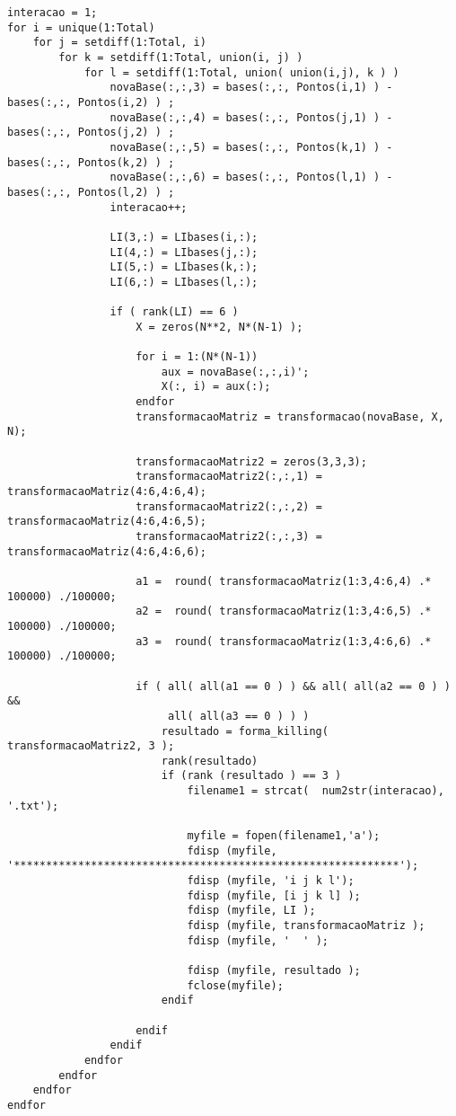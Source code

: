 \documentclass[twoside,openright,titlepage,numbers=noenddot,headinclude,  lineheaders footinclude=true,cleardoublepage=empty,
                                BCOR=5mm,paper=a4,fontsize=12pt ]{scrbook}
\theoremstyle{definition}
\begin{document}
\begin{lstlisting}
interacao = 1;
for i = unique(1:Total)
	for j = setdiff(1:Total, i)
		for k = setdiff(1:Total, union(i, j) )
			for l = setdiff(1:Total, union( union(i,j), k ) )
				novaBase(:,:,3) = bases(:,:, Pontos(i,1) ) - bases(:,:, Pontos(i,2) ) ;
				novaBase(:,:,4) = bases(:,:, Pontos(j,1) ) - bases(:,:, Pontos(j,2) ) ; 
				novaBase(:,:,5) = bases(:,:, Pontos(k,1) ) - bases(:,:, Pontos(k,2) ) ; 
				novaBase(:,:,6) = bases(:,:, Pontos(l,1) ) - bases(:,:, Pontos(l,2) ) ; 
				interacao++;

				LI(3,:) = LIbases(i,:);						
				LI(4,:) = LIbases(j,:);						
				LI(5,:) = LIbases(k,:);						
				LI(6,:) = LIbases(l,:);						

				if ( rank(LI) == 6 )
					X = zeros(N**2, N*(N-1) );
					
					for i = 1:(N*(N-1))
						aux = novaBase(:,:,i)';
						X(:, i) = aux(:);
					endfor
					transformacaoMatriz = transformacao(novaBase, X, N);
	
					transformacaoMatriz2 = zeros(3,3,3);
					transformacaoMatriz2(:,:,1) = transformacaoMatriz(4:6,4:6,4);
					transformacaoMatriz2(:,:,2) = transformacaoMatriz(4:6,4:6,5);
					transformacaoMatriz2(:,:,3) = transformacaoMatriz(4:6,4:6,6);
					
					a1 =  round( transformacaoMatriz(1:3,4:6,4) .* 100000) ./100000;
					a2 =  round( transformacaoMatriz(1:3,4:6,5) .* 100000) ./100000;
					a3 =  round( transformacaoMatriz(1:3,4:6,6) .* 100000) ./100000;
					
					if ( all( all(a1 == 0 ) ) && all( all(a2 == 0 ) ) &&
					     all( all(a3 == 0 ) ) )
						resultado = forma_killing( transformacaoMatriz2, 3 );
						rank(resultado)
						if (rank (resultado ) == 3 )
							filename1 = strcat(  num2str(interacao), '.txt');
	
							myfile = fopen(filename1,'a');
							fdisp (myfile, '************************************************************');
							fdisp (myfile, 'i j k l');
							fdisp (myfile, [i j k l] );
							fdisp (myfile, LI );
							fdisp (myfile, transformacaoMatriz );
							fdisp (myfile, '  ' );
				
							fdisp (myfile, resultado );
							fclose(myfile);	
						endif

					endif
				endif
			endfor
		endfor
	endfor
endfor
\end{lstlisting}
%


\end{document}
